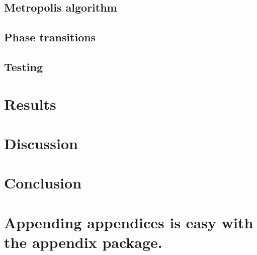 \documentclass[aps,reprint]{revtex4-1}
\newcommand\blankpage{%
  \null
  \thispagestyle{empty}%
  \addtocounter{page}{-1}%
  \newpage}
\begin{document}
\subsection{Metropolis algorithm}

\subsection{Phase transitions}

\subsection{Testing}
\section{Results}
\label{sec:results}

\section{Discussion}
\label{sec:discussion}

\section{Conclusion}
\label{sec:conclusion}


\blankpage
\appendix
\section{Appending appendices is easy with the appendix package.}
\blankpage
\end{document}
